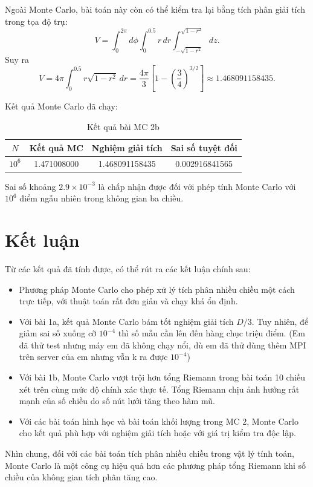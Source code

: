 \documentclass{article}
\begin{document}
Ngoài Monte Carlo, bài toán này còn có thể kiểm tra lại bằng tích phân giải tích trong tọa độ trụ:
\[
V = \int_0^{2\pi}\!d\phi\int_0^{0.5}\!r\,dr\int_{-\sqrt{1-r^2}}^{\sqrt{1-r^2}}\!dz.
\]
Suy ra
\[
V = 4\pi \int_0^{0.5} r\sqrt{1-r^2}\,dr
= \frac{4\pi}{3}\left[1-\left(\frac{3}{4}\right)^{3/2}\right]
\approx 1.468091158435.
\]

Kết quả Monte Carlo đã chạy:
\begin{table}[H]
\centering
\caption{Kết quả bài MC 2b}
\label{tab:mc2b}
\begin{tabular}{cccc}
\toprule
$N$ & Kết quả MC & Nghiệm giải tích & Sai số tuyệt đối \\
\midrule
$10^6$ & 1.471008000 & 1.468091158435 & 0.002916841565 \\
\bottomrule
\end{tabular}
\end{table}

Sai số khoảng $2.9\times 10^{-3}$ là chấp nhận được đối với phép tính Monte Carlo với $10^6$ điểm ngẫu nhiên trong không gian ba chiều.

\section{Kết luận}

Từ các kết quả đã tính được, có thể rút ra các kết luận chính sau:
\begin{itemize}
    \item Phương pháp Monte Carlo cho phép xử lý tích phân nhiều chiều một cách trực tiếp, với thuật toán rất đơn giản và chạy khá ổn định.
    \item Với bài 1a, kết quả Monte Carlo bám tốt nghiệm giải tích $D/3$. Tuy nhiên, để giảm sai số xuống cỡ $10^{-4}$ thì số mẫu cần lên đến hàng chục triệu điểm. (Em đã thử test nhưng máy em đã không chạy nổi, dù em đã thử dùng thêm MPI trên server của em nhưng vẫn k ra được $10^{-4}$)
    \item Với bài 1b, Monte Carlo vượt trội hơn tổng Riemann trong bài toán 10 chiều xét trên cùng mức độ chính xác thực tế. Tổng Riemann chịu ảnh hưởng rất mạnh của số chiều do số nút lưới tăng theo hàm mũ.
    \item Với các bài toán hình học và bài toán khối lượng trong MC 2, Monte Carlo cho kết quả phù hợp với nghiệm giải tích hoặc với giá trị kiểm tra độc lập.
\end{itemize}

Nhìn chung, đối với các bài toán tích phân nhiều chiều trong vật lý tính toán, Monte Carlo là một công cụ hiệu quả hơn các phương pháp tổng Riemann khi số chiều của không gian tích phân tăng cao.
\end{document}
